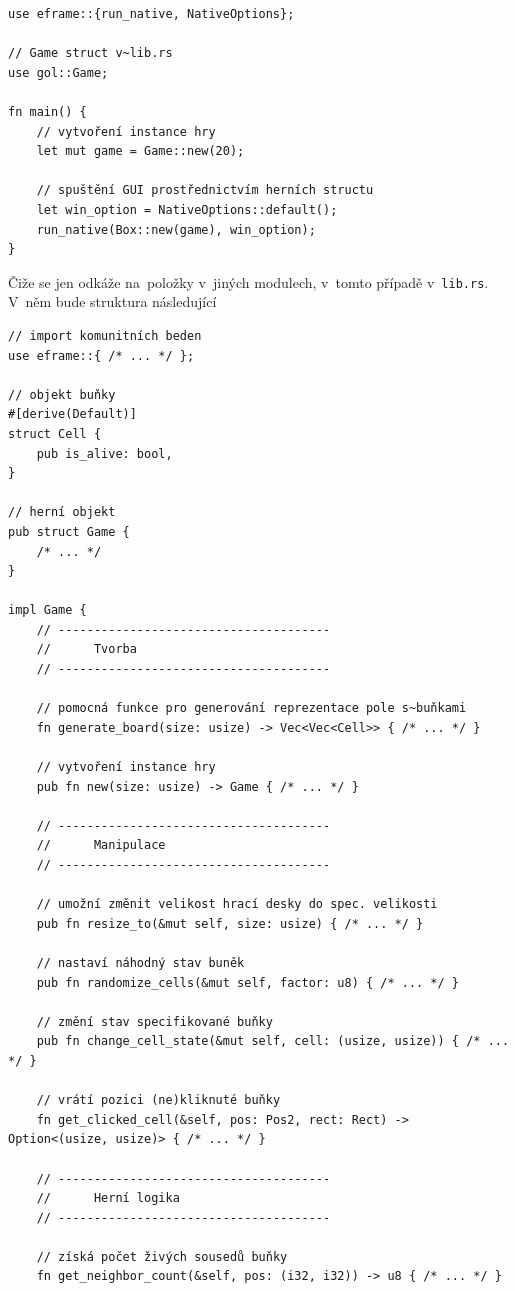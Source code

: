 \documentclass[a4paper, 12pt]{article} %
\begin{document}
        \begin{verbatim}
use eframe::{run_native, NativeOptions};

// Game struct v~lib.rs
use gol::Game;

fn main() {
    // vytvoření instance hry
    let mut game = Game::new(20);

    // spuštění GUI prostřednictvím herních structu
    let win_option = NativeOptions::default();
    run_native(Box::new(game), win_option);
}
        \end{verbatim}
        
        Čiže se jen odkáže na~položky v~jiných modulech, v~tomto případě v~\texttt{lib.rs}. V~něm bude struktura následující
        \begin{verbatim}
// import komunitních beden
use eframe::{ /* ... */ };

// objekt buňky
#[derive(Default)]
struct Cell {
    pub is_alive: bool,
}

// herní objekt
pub struct Game {
    /* ... */
}

impl Game {
    // --------------------------------------
    //      Tvorba
    // --------------------------------------

    // pomocná funkce pro generování reprezentace pole s~buňkami
    fn generate_board(size: usize) -> Vec<Vec<Cell>> { /* ... */ }

    // vytvoření instance hry
    pub fn new(size: usize) -> Game { /* ... */ }

    // --------------------------------------
    //      Manipulace
    // --------------------------------------

    // umožní změnit velikost hrací desky do spec. velikosti
    pub fn resize_to(&mut self, size: usize) { /* ... */ }

    // nastaví náhodný stav buněk
    pub fn randomize_cells(&mut self, factor: u8) { /* ... */ }

    // změní stav specifikované buňky
    pub fn change_cell_state(&mut self, cell: (usize, usize)) { /* ... */ }

    // vrátí pozici (ne)kliknuté buňky
    fn get_clicked_cell(&self, pos: Pos2, rect: Rect) -> Option<(usize, usize)> { /* ... */ }

    // --------------------------------------
    //      Herní logika
    // --------------------------------------

    // získá počet živých sousedů buňky
    fn get_neighbor_count(&self, pos: (i32, i32)) -> u8 { /* ... */ }


\end{verbatim}
\end{document}
